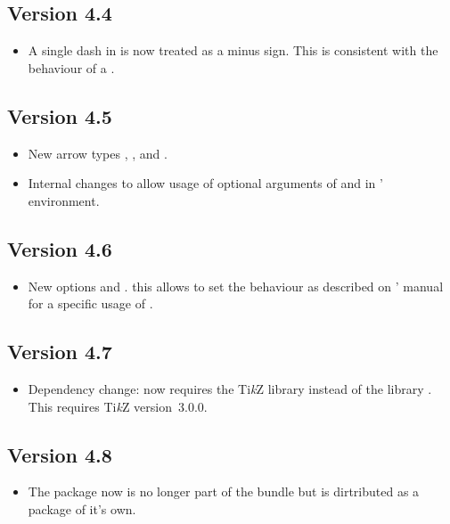 \documentclass[load-preamble+]{cnltx-doc}
\newcommand*\TikZ{Ti\textit{k}Z}
\begin{document}
\subsection{Version 4.4}
\begin{itemize}
  \item A single dash \code{-} in  is now treated as a minus sign.
  This is consistent with the behaviour of a \code{+}.
\end{itemize}

\subsection{Version 4.5}
\begin{itemize}
  \item New arrow types \arrowtype{>=<}, \arrowtype{>=<<}, \arrowtype{>>=<}
    and \arrowtype{<==>}.
  \item Internal changes to  allow usage of optional arguments of
    \cs*{\textbackslash} and  in \chemmacros' 
    environment.
\end{itemize}

\subsection{Version 4.6}
\begin{itemize}
  \item New options  and .  this allows to
    set the behaviour as described on \chemmacros' manual for a specific usage
    of .
\end{itemize}

\subsection{Version 4.7}
\begin{itemize}
  \item Dependency change: \chemformula{} now requires the \TikZ{} library
     instead of the library .  This requires
    \TikZ{} version~3.0.0.
\end{itemize}

\subsection{Version 4.8}
\begin{itemize}
  \item The \chemformula{} package now is no longer part of the \chemmacros{}
    bundle but is dirtributed as a package of it's own.
\end{itemize}
\end{document}
